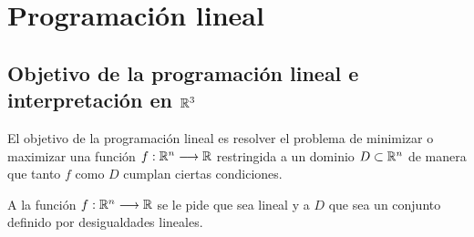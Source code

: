 \chapter{Programación lineal}

\section{Objetivo de la programación lineal e interpretación en $\mathbb R^3$}
El objetivo de la programación lineal es resolver el problema de
minimizar o maximizar una función $f:\mathbb R^n\longrightarrow\mathbb R$
restringida a un dominio $D\subset\mathbb R^n$ de manera que tanto $f$ como
$D$ cumplan ciertas condiciones.

A la función $f:\mathbb R^n\longrightarrow\mathbb R$ se le pide que sea lineal y a $D$ que sea un conjunto definido por desigualdades lineales.